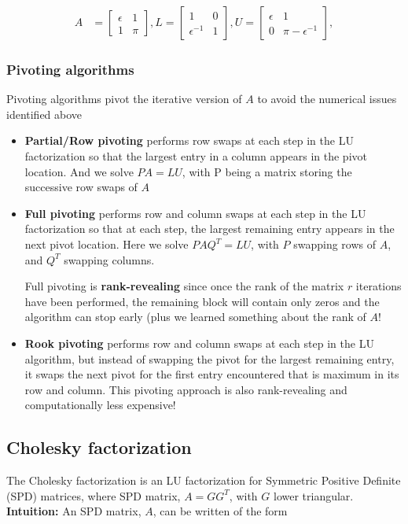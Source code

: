\documentclass{article}
\begin{document}
\begin{align*}
    A &= \begin{bmatrix} \epsilon & 1\\ 1 &  \pi \end{bmatrix},
    L = \begin{bmatrix} 1 & 0\\ \epsilon^{-1}& 1 \end{bmatrix},
    U = \begin{bmatrix} \epsilon & 1\\ 0 &  \pi - \epsilon^{-1} \end{bmatrix},
\end{align*}


\subsubsection{Pivoting algorithms}
Pivoting algorithms pivot the iterative version of $A$ to avoid the numerical issues identified above
\begin{itemize}
    \item \textbf{Partial/Row pivoting} performs row swaps at each step in the LU factorization so that the largest entry in a column appears in the pivot location. And we solve $PA = LU$, with P being a matrix storing the successive row swaps of $A$
    \item \textbf{Full pivoting} performs row and column swaps at each step in the LU factorization so that at each step, the largest remaining entry appears in the next pivot location. Here we solve $PAQ^T = LU$, with $P$ swapping rows of $A$, and $Q^T$ swapping columns.
    
    Full pivoting is \textbf{rank-revealing} since once the rank of the matrix $r$ iterations have been performed, the remaining block will contain only zeros and the algorithm can stop early (plus we learned something about the rank of $A$!
    \item \textbf{Rook pivoting} performs row and column swaps at each step in the LU algorithm, but instead of swapping the pivot for the largest remaining entry, it swaps the next pivot for the first entry encountered that is maximum in its row and column. This pivoting approach is also rank-revealing and computationally less expensive!
\end{itemize}


\subsection{Cholesky factorization}
The Cholesky factorization is an LU factorization for Symmetric Positive Definite (SPD) matrices, where SPD matrix, $A = GG^T$, with $G$ lower triangular.\\
\textbf{Intuition:} An SPD matrix, $A$, can be written of the form
\end{document}
